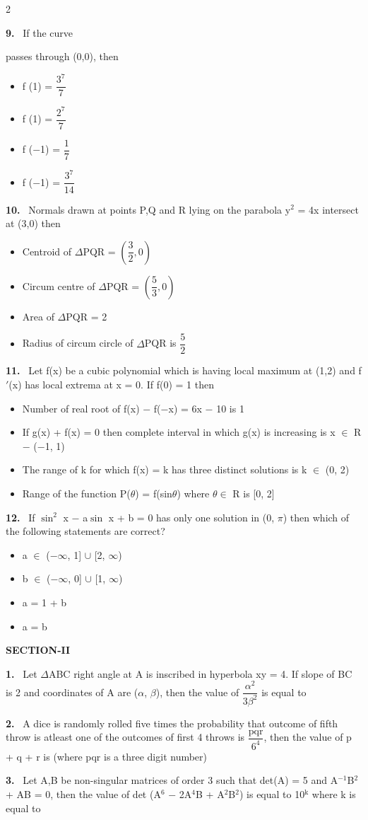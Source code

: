 \documentclass[10pt]{extarticle}
\newcommand{\sect}[1]{\par\smallskip\noindent\textbf{#1}\par}
\newcommand{\qn}[1]{\par\smallskip\noindent\textbf{#1.}~}
\newenvironment{qoptions}{\begin{itemize}[leftmargin=1.8em,itemsep=1pt,topsep=2pt,label={}]}{\end{itemize}}
\newcommand{\opt}[2]{\item[(#1)] #2}
\begin{document}
\begin{multicols}{2}
\qn{9} If the curve\par{}\par passes through (0,0), then
\begin{qoptions}
\opt{A}{f (1) = $\dfrac{3^7}{7}$}
\opt{B}{f (1) = $\dfrac{2^7}{7}$}
\opt{C}{f ($-$1) = $\dfrac17$}
\opt{D}{f ($-$1) = $\dfrac{3^7}{14}$}
\end{qoptions}
\qn{10} Normals drawn at points P,Q and R lying on the parabola y$^2$ = 4x intersect at (3,0) then
\begin{qoptions}
\opt{A}{Centroid of $\Delta$PQR = $\left(\dfrac32,0\right)$}
\opt{B}{Circum centre of $\Delta$PQR = $\left(\dfrac53,0\right)$}
\opt{C}{Area of $\Delta$PQR = 2}
\opt{D}{Radius of circum circle of $\Delta$PQR is $\dfrac52$}
\end{qoptions}
\qn{11} Let f(x) be a cubic polynomial which is having local maximum at (1,2) and f$'$(x) has local extrema at x = 0. If f(0) = 1 then
\begin{qoptions}
\opt{A}{Number of real root of f(x) $-$ f($-$x) = 6x $-$ 10 is 1}
\opt{B}{If g(x) + f(x) = 0 then complete interval in which g(x) is increasing is x $\in$ R $-$ ($-$1, 1)}
\opt{C}{The range of k for which f(x) = k has three distinct solutions is k $\in$ (0, 2)}
\opt{D}{Range of the function P($\theta$) = f(sin$\theta$) where $\theta\in$ R is [0, 2]}
\end{qoptions}
\qn{12} If $\sin^2$ x $-$ a$\sin$ x + b = 0 has only one solution in (0, $\pi$) then which of the following statements are correct?
\begin{qoptions}
\opt{A}{a $\in$ ($-\infty$, 1] $\cup$ [2, $\infty$)}
\opt{B}{b $\in$ ($-\infty$, 0] $\cup$ [1, $\infty$)}
\opt{C}{a = 1 + b}
\opt{D}{a = b}
\end{qoptions}
\sect{SECTION-II}
\qn{1} Let $\Delta$ABC right angle at A is inscribed in hyperbola xy = 4. If slope of BC is 2 and coordinates of A are ($\alpha$, $\beta$), then the value of $\dfrac{\alpha^2}{3\beta^2}$ is equal to
\qn{2} A dice is randomly rolled five times the probability that outcome of fifth throw is atleast one of the outcomes of first 4 throws is $\dfrac{\mathrm{pqr}}{6^4}$, then the value of p + q + r is (where pqr is a three digit number)
\qn{3} Let A,B be non-singular matrices of order 3 such that det(A) = 5 and A$^{-1}$B$^2$ + AB = 0, then the value of det (A$^6$ $-$ 2A$^4$B + A$^2$B$^2$) is equal to 10$^\mathrm k$ where k is equal to

\end{multicols}
\end{document}
